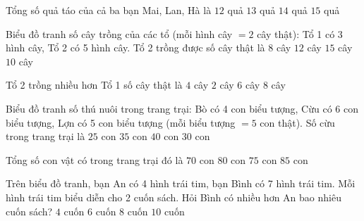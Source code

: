 \begin{ex} %
Tổng số quả táo của cả ba bạn Mai, Lan, Hà là
\choice
{$12$ quả}
{\True $13$ quả}
{$14$ quả}
{$15$ quả}
\end{ex}

\begin{ex} %
Biểu đồ tranh số cây trồng của các tổ (mỗi hình cây $= 2$ cây thật): Tổ 1 có 3 hình cây, Tổ 2 có 5 hình cây. Tổ 2 trồng được số cây thật là
\choice
{$8$ cây}
{$12$ cây}
{$15$ cây}
{\True $10$ cây}
\end{ex}

\begin{ex} %
Tổ 2 trồng nhiều hơn Tổ 1 số cây thật là
\choice
{\True $4$ cây}
{$2$ cây}
{$6$ cây}
{$8$ cây}
\end{ex}

\begin{ex} %
Biểu đồ tranh số thú nuôi trong trang trại: Bò có 4 con biểu tượng, Cừu có 6 con biểu tượng, Lợn có 5 con biểu tượng (mỗi biểu tượng $= 5$ con thật). Số cừu trong trang trại là
\choice
{$25$ con}
{$35$ con}
{$40$ con}
{\True $30$ con}
\end{ex}

\begin{ex} %
Tổng số con vật có trong trang trại đó là
\choice
{$70$ con}
{$80$ con}
{\True $75$ con}
{$85$ con}
\end{ex}

\begin{ex} %
Trên biểu đồ tranh, bạn An có 4 hình trái tim, bạn Bình có 7 hình trái tim. Mỗi hình trái tim biểu diễn cho 2 cuốn sách. Hỏi Bình có nhiều hơn An bao nhiêu cuốn sách?
\choice
{$4$ cuốn}
{\True $6$ cuốn}
{$8$ cuốn}
{$10$ cuốn}
\end{ex}

